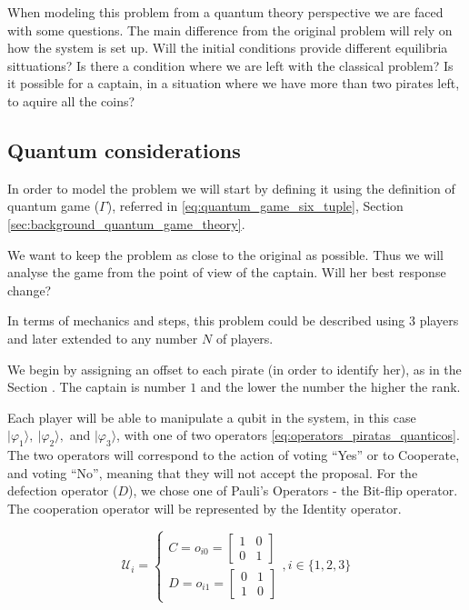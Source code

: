 When modeling this problem from a quantum theory perspective we are faced with some questions. The main difference from the original problem will rely on how the system is set up. Will the initial conditions provide different equilibria sittuations? Is there a condition where we are left with the classical problem? Is it possible for a captain, in a situation where we have more than two pirates left, to aquire all the coins?





\subsection{Quantum considerations}
\label{subsec:description_2}

In order to model the problem we will start by defining it using the definition of quantum game ($\Gamma$), referred in \ref{eq:quantum_game_six_tuple}, Section \ref{sec:background_quantum_game_theory}. 

We want to keep the problem as close to the original as possible. Thus we will analyse the game from the point of view of the captain. Will her best response change?

In terms of mechanics and steps, this problem could be described using $3$ players and later extended to any number $N$ of players. 

We begin by assigning an offset to each pirate (in order to identify her), as in the Section \label{subsec:description}. The captain is number $1$ and the lower the number the higher the rank. 

Each player will be able to manipulate a qubit in the system, in this case $\vert\varphi_{1}\rangle,\:\vert\varphi_{2}\rangle,$ and $\vert\varphi_{3}\rangle$, with one of two operators \ref{eq:operators_piratas_quanticos}. The two operators will correspond to the action of voting ``Yes'' or to Cooperate, and voting ``No'', meaning that they will not accept the proposal. For the defection operator ($D$), we chose one of Pauli's Operators - the Bit-flip operator. The cooperation operator will be represented by the Identity operator. 

\begin{equation}
\label{eq:operators_piratas_quanticos}
\mathcal{U}_{i} = \begin{cases}
C = o_{i0}=\left[\begin{array}{cc}
1 & 0\\
0 & 1
\end{array}\right]\\
D = o_{i1}=\left[\begin{array}{cc}
0 & 1\\
1 & 0
\end{array}\right]
\end{cases} , i \in \{ 1, 2, 3 \}
\end{equation}

